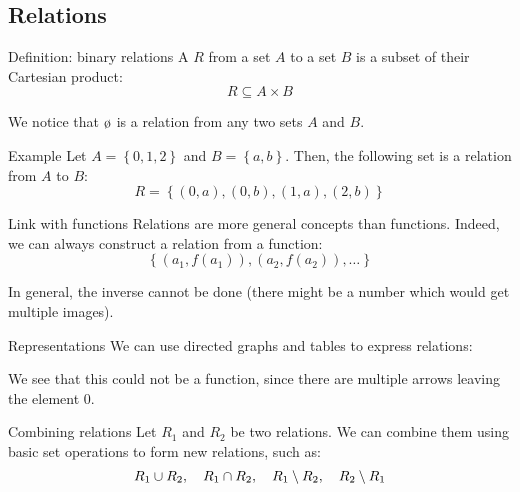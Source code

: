 \documentclass[a4paper]{article}
\begin{document}
\subsection{Relations}
\begin{parag}{Definition: binary relations}
    A  $R$ from a set $A$ to a set $B$ is a subset of their Cartesian product: 
    \[R \subseteq A \times B\]

    We notice that $\o$ is a relation from any two sets $A$ and $B$. 
    
    \begin{subparag}{Example}
        Let $A = \left\{0, 1, 2\right\}$ and $B = \left\{a, b\right\}$. Then, the following set is a relation from $A$ to $B$: 
        \[R = \left\{\left(0, a\right), \left(0, b\right), \left(1, a\right), \left(2, b\right)\right\}\]
    \end{subparag}

    \begin{subparag}{Link with functions}
        Relations are more general concepts than functions. Indeed, we can always construct a relation from a function:
        \[\left\{(a_1, f(a_1)), (a_2, f(a_2)), \ldots\right\}\]

        In general, the inverse cannot be done (there might be a number which would get multiple images).
    \end{subparag}
\end{parag}

\begin{parag}{Representations}
    We can use directed graphs and tables to express relations:

    We see that this could not be a function, since there are multiple arrows leaving the element $0$.
\end{parag}


\begin{parag}{Combining relations}
    Let $R_1$ and $R_2$ be two relations. We can combine them using basic set operations to form new relations, such as: 
    \[R_1 \cup R_2, \quad R_1 \cap R_2, \quad R_1 \setminus R_2, \quad R_2 \setminus R_1\]
\end{parag}
\end{document}
